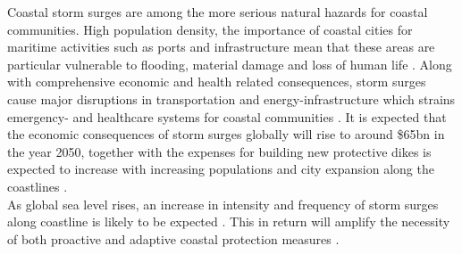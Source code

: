 Coastal storm surges are among the more serious natural hazards for coastal communities. High population density, the importance of coastal cities for maritime activities such as ports and infrastructure mean that these areas are particular vulnerable to flooding, material damage and loss of human life \citep{kaniewski_solar_2016}. 
Along with comprehensive economic and health related consequences, storm surges cause major disruptions in transportation and energy-infrastructure which strains emergency- and healthcare systems for coastal communities \citep{lane_health_2013}. 
It is expected that the economic consequences of storm surges globally will rise to around \$65bn in the year 2050, together with the expenses for building new protective dikes is expected to increase with increasing populations and city expansion along the coastlines \citep{hallegatte_future_2013, prahl_damage_2018}.\\
As global sea level rises, an increase in intensity and frequency of storm surges along coastline is likely to be expected \citep{muis_global_2023}. This in return will amplify the necessity of both proactive and adaptive coastal protection measures \citep{marsooli_climate_2019, dedekorkut-howes_when_2020}.\\

